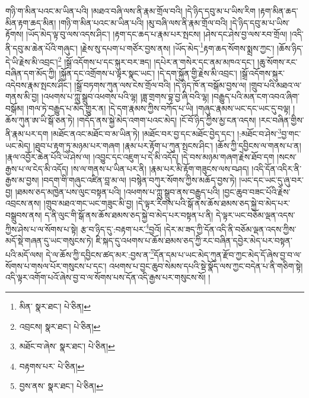 གཉི་ག་མིན་པའང་མ་ཡིན་པའི། །མཐའ་བཞི་ལས་ནི་རྣམ་གྲོལ་བའི། །དེ་ཉིད་དབུ་མ་པ་ཡིས་རིག །རྟག་མིན་ཆད་མིན་རྟག་ཆད་མིན། །གཉི་ག་མིན་པའང་མ་ཡིན་པའི། །མུ་བཞི་ལས་ནི་རྣམ་གྲོལ་བའི། །དེ་ཉིད་དབུ་མ་པ་ཡིས་རྟོགས། །ཡོད་མེད་ལྟ་བུ་ལས་འདས་ཤིང་། །རྟག་དང་ཆད་པ་རྣམ་པར་སྤངས། །ཤེས་དང་ཤེས་བྱ་ལས་རབ་གྲོལ། །འདི་ནི་དབུ་མ་ཆེན་པོའི་གཞུང་། །རྗེས་སུ་དཔག་པ་གཙོར་བྱས་ནས། །ཡོད་མེད་\footnote{མིན་  སྣར་ཐང་།  པེ་ཅིན། }རྟག་ཆད་སོགས་སྨྲས་ཀྱང་། །ཆོས་ཉིད་དེ་ཡི་རྗེས་མི་འབྲང་།\footnote{འབྲངས།  སྣར་ཐང་།  པེ་ཅིན། } །སྒྲོ་འདོགས་པ་དང་སྐུར་བར་ཟད། །དཔེར་ན་གསེར་དང་ནམ་མཁའ་དང་། །ཆུ་སོགས་རང་བཞིན་དག་མོད་ཀྱི། །སྐྱོན་དང་འགྲོགས་པ་ལྟར་སྣང་ཡང་། །དེ་དག་སྐྱོན་གྱི་རྗེས་མི་འབྲང་། །སྒྲོ་འདོགས་སྐུར་འདེབས་རྣམ་སྤངས་ཤིང་། །སྒྲོ་བཏགས་ཀུན་ལས་ངེས་གྲོལ་བའི། །དེ་ཉིད་ཁོ་ན་བསྒོམ་བྱས་ལ། །གྲུབ་པའི་མཐའ་ལ་གནས་མི་བྱ། །འཕགས་པ་ཀླུ་སྒྲུབ་འཕགས་པའི་ལྷ། །ཟླ་གྲགས་བྷ་བྱ་ཞི་བའི་ལྷ། །བརྒྱུད་པའི་མན་ངག་འབའ་ཞིག་བསྒོམ། །གལ་ཏེ་བརྒྱུད་པ་མེད་གྱུར་ན། །དེ་དག་རྣམས་ཀྱིས་བཀོད་པ་ཡི། །གཞུང་རྣམས་ཡང་དང་ཡང་དུ་བལྟ། །ཆོས་ཀུན་ཨ་ཡི་སྒོ་ཅན་ཏེ། །གདོད་ནས་སྐྱེ་མེད་འགག་པའང་མེད། །ངོ་བོ་ཉིད་ཀྱིས་མྱ་ངན་འདས། །རང་བཞིན་གྱིས་ནི་རྣམ་པར་དག །མཐོང་ནའང་མཐོང་བ་མ་ཡིན་ཏེ། །མཐོང་བར་བྱ་དང་མཐོང་བྱེད་དང་། །:མཐོང་བ་ཤེས་\footnote{མཐོང་བ་ཞེས་  སྣར་ཐང་།  པེ་ཅིན། }བྱ་གང་ཡང་མེད། །ཐུབ་པ་རྟག་ཏུ་མཉམ་པར་གཞག །རྣམ་པར་རྟོག་པ་ཀུན་སྤངས་ཤིང་། །ཆོས་ཀྱི་དབྱིངས་ལ་གནས་པ་ན། །རྣལ་འབྱོར་ཆེན་པོའི་ཡེ་ཤེས་ལ། །འབྱུང་དང་འཇུག་པ་དེ་མི་འདོད། །དེ་བས་མཉམ་གཞག་རྗེས་ཐོབ་དག །སངས་རྒྱས་པ་ལ་ངེད་མི་འདོད། །ས་ལ་གནས་པ་ཡིན་པར་ནི། །རྣམ་པར་མི་རྟོག་གཟུངས་ལས་བཤད། །འདི་དོན་འདིར་ནི་རྒྱས་མ་བྱས། །བདག་གི་གཞུང་འཛིན་བླ་མ་ལ། །བསྙེན་བཀུར་སོགས་ཀྱིས་མཆོད་བྱས་ཏེ། །ཡང་དང་ཡང་དུ་ཞུ་བར་བྱ། །ཐམས་ཅད་མཁྱེན་པས་ལུང་བསྟན་པའི། །འཕགས་པ་ཀླུ་སྒྲུབ་ནས་བརྒྱུད་པའི། །བྱང་ཆུབ་བཟང་པོའི་རྗེས་འབྲངས་ནས། །གྲུབ་མཐའ་གང་ཡང་གཟུང་མི་བྱ། །དེ་ལྟར་རིགས་པའི་སྒོ་ནས་ཆོས་ཐམས་ཅད་སྐྱེ་བ་མེད་པར་བསྒྲུབས་ནས། ད་ནི་ལུང་གི་སྒོ་ནས་ཆོས་ཐམས་ཅད་སྐྱེ་བ་མེད་པར་བསྟན་པ་ནི། དེ་ལྟར་ཡང་བཅོམ་ལྡན་འདས་ཀྱིས་ཤེས་པ་ལ་སོགས་པ་སྟེ། རྩ་བ་ཉིད་དུ་:བརྟག་པར་\footnote{བརྟགས་པར་  པེ་ཅིན། }བྱའོ། །དེར་མ་ཟད་ཀྱི་དོན་འདི་ནི་བཅོམ་ལྡན་འདས་ཀྱིས་མདོ་སྡེ་གཞན་དུ་ཡང་གསུངས་ཏེ། ཇི་སྐད་དུ་འཕགས་པ་ཆོས་ཐམས་ཅད་ཀྱི་རང་བཞིན་དབྱེར་མེད་པར་བསྟན་པའི་མདོ་ལས། དེ་ལ་ཆོས་ཀྱི་དབྱིངས་ཚད་མར་:བྱས་ན་\footnote{བྱས་ནས་  སྣར་ཐང་།  པེ་ཅིན། }དོན་དམ་པ་ཡང་མེད་ཀུན་རྫོབ་ཀྱང་མེད་དོ་ཞེས་བྱ་བ་ལ་སོགས་པ་གསལ་པོར་གསུངས་པ་དང་། འཕགས་པ་བྱང་ཆུབ་སེམས་དཔའི་སྡེ་སྣོད་ལས་ཀྱང་བདེན་པ་ནི་གཅིག་སྟེ། འདི་ལྟར་འགོག་པའོ་ཞེས་བྱ་བ་ལ་སོགས་པས་དོན་འདི་རྒྱས་པར་གསུངས་སོ། །
